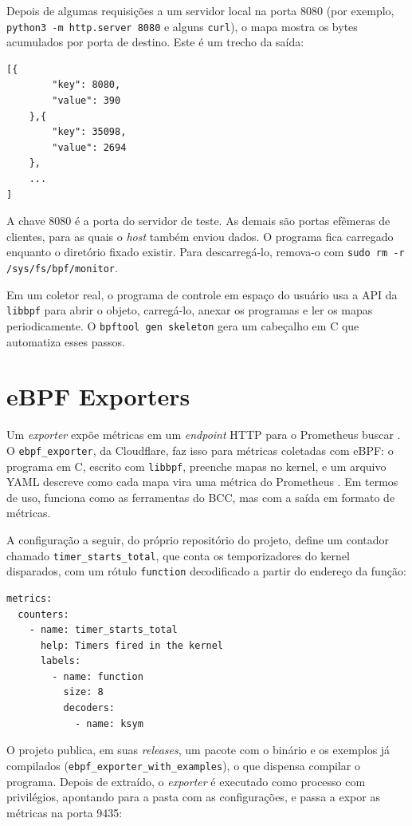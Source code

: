Depois de algumas requisições a um servidor local na porta 8080 (por exemplo, \texttt{python3 -m http.server 8080} e alguns \texttt{curl}), o mapa mostra os bytes acumulados por porta de destino. Este é um trecho da saída:

\begin{lstlisting}
[{
        "key": 8080,
        "value": 390
    },{
        "key": 35098,
        "value": 2694
    },
    ...
]
\end{lstlisting}

A chave 8080 é a porta do servidor de teste. As demais são portas efêmeras de clientes, para as quais o \textit{host} também enviou dados. O programa fica carregado enquanto o diretório fixado existir. Para descarregá-lo, remova-o com \texttt{sudo rm -r /sys/fs/bpf/monitor}.

Em um coletor real, o programa de controle em espaço do usuário usa a API da \texttt{libbpf} para abrir o objeto, carregá-lo, anexar os programas e ler os mapas periodicamente. O \texttt{bpftool gen skeleton} gera um cabeçalho em C que automatiza esses passos.

\section{eBPF Exporters}\label{sec:ebpf-exporter}

Um \textit{exporter} expõe métricas em um \textit{endpoint} HTTP para o Prometheus buscar \cite{turnbull2018}. O \texttt{ebpf\_exporter}, da Cloudflare, faz isso para métricas coletadas com eBPF: o programa em C, escrito com \texttt{libbpf}, preenche mapas no kernel, e um arquivo YAML descreve como cada mapa vira uma métrica do Prometheus \cite{ebpfexporter}. Em termos de uso, funciona como as ferramentas do BCC, mas com a saída em formato de métricas.

A configuração a seguir, do próprio repositório do projeto, define um contador chamado \texttt{timer\_starts\_total}, que conta os temporizadores do kernel disparados, com um rótulo \texttt{function} decodificado a partir do endereço da função:

\begin{lstlisting}
metrics:
  counters:
    - name: timer_starts_total
      help: Timers fired in the kernel
      labels:
        - name: function
          size: 8
          decoders:
            - name: ksym
\end{lstlisting}

O projeto publica, em suas \textit{releases}, um pacote com o binário e os exemplos já compilados (\texttt{ebpf\_exporter\_with\_examples}), o que dispensa compilar o programa. Depois de extraído, o \textit{exporter} é executado como processo com privilégios, apontando para a pasta com as configurações, e passa a expor as métricas na porta 9435:

